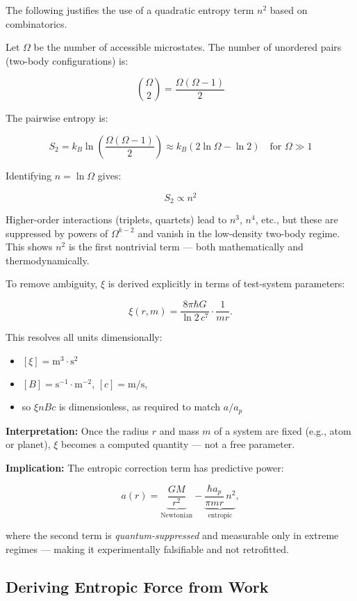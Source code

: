 \documentclass[12pt]{article}
\begin{document}
The following justifies the use of a quadratic entropy term $n^2$ based on combinatorics.

Let $\Omega$ be the number of accessible microstates. The number of unordered pairs (two-body configurations) is:

\[
\binom{\Omega}{2} = \frac{\Omega(\Omega - 1)}{2}
\]

The pairwise entropy is:

\[
S_2 = k_B \ln\left( \frac{\Omega(\Omega - 1)}{2} \right) \approx k_B \left( 2\ln \Omega - \ln 2 \right) \quad \text{for } \Omega \gg 1
\]

Identifying $n = \ln \Omega$ gives:

\[
S_2 \propto n^2
\]

Higher-order interactions (triplets, quartets) lead to $n^3$, $n^4$, etc., but these are suppressed by powers of $\Omega^{k-2}$ and vanish in the low-density two-body regime. This shows $n^2$ is the first nontrivial term — both mathematically and thermodynamically.


To remove ambiguity, $\xi$ is derived explicitly in terms of test-system parameters:

\[
\boxed{\xi(r,m) = \frac{8\pi \hbar G}{\ln 2 \, c^7} \cdot \frac{1}{mr}}.
\]

This resolves all units dimensionally:
\begin{itemize}
    \item $[\xi] = \text{m}^3 \cdot \text{s}^2$
    \item $[B] = \text{s}^{-1} \cdot \text{m}^{-2}$, $[c] = \text{m/s}$,
    \item so $\xi n B c$ is dimensionless, as required to match $a / a_p$
\end{itemize}

\textbf{Interpretation:} Once the radius $r$ and mass $m$ of a system are fixed (e.g., atom or planet), $\xi$ becomes a computed quantity — not a free parameter.

\textbf{Implication:} The entropic correction term has predictive power:

\[
a(r) = \underbrace{\frac{GM}{r^2}}_{\text{Newtonian}} - \underbrace{\frac{\hbar a_p}{\pi m r} \, n^2}_{\text{entropic}},
\]

where the second term is \emph{quantum-suppressed} and measurable only in extreme regimes — making it experimentally falsifiable and not retrofitted.

\subsection{Deriving Entropic Force from Work}
\end{document}
